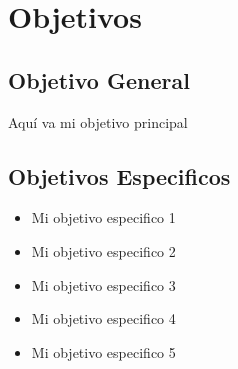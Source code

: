 \chapter{Objetivos}
\ifpdf
    \graphicspath{{Chapter2/Chapter2Figs/PNG/}{Chapter2/Chapter2Figs/PDF/}{Chapter2/Chapter2Figs/}}
\else
    \graphicspath{{Chapter2/Chapter2Figs/EPS/}{Chapter2/Chapter2Figs/}}
\fi


\section{Objetivo General}

Aquí va mi objetivo principal

\section{Objetivos Especificos}

\begin{itemize}
	\item{Mi objetivo especifico 1}
	\item{Mi objetivo especifico 2}
	\item{Mi objetivo especifico 3}
	\item{Mi objetivo especifico 4}
	\item{Mi objetivo especifico 5}
\end{itemize}



